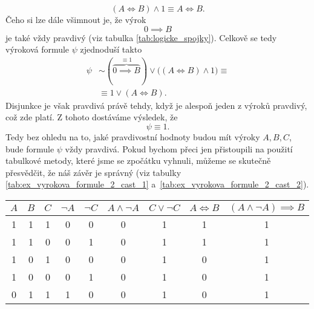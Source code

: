 \begin{example}
\begin{solution}
        \begin{equation*}
            (A \iff B) \land 1 \equiv  A \iff B.
        \end{equation*}
        Čeho si lze dále všimnout je, že výrok
        \begin{equation*}
            0 \implies B
        \end{equation*}
        je také vždy pravdivý (viz tabulka \ref{tab:logicke_spojky}). Celkově se tedy výroková formule $\psi$ zjednoduší takto
        \begin{align*}
            \psi&\sim (\overbrace{0 \implies B}^{\equiv 1}) \lor \bigl((A \iff B) \land 1\bigr)\equiv  \\ &\equiv 1 \lor (A \iff B).
        \end{align*}
        Disjunkce je však pravdivá právě tehdy, když je alespoň jeden z výroků pravdivý, což zde platí. Z tohoto dostáváme výsledek, že
        \begin{equation*}
            \psi\equiv 1.
        \end{equation*}
        Tedy bez ohledu na to, jaké pravdivostní hodnoty budou mít výroky $A,B,C$, bude formule $\psi$ vždy pravdivá. Pokud bychom přeci jen přistoupili na použití tabulkové metody, které jsme se zpočátku vyhnuli, můžeme se skutečně přesvědčit, že náš závěr je správný (viz tabulky \ref{tab:ex_vyrokova_formule_2_cast_1} a~\ref{tab:ex_vyrokova_formule_2_cast_2}).
        \begin{table}[h]
            \centering
            \begin{tabular}{|ccc|cccccc|}
            \hline
            $A$ & $B$ & $C$ & $\neg A$ & $\neg C$ & $A \land \neg A$ & $C \lor \neg C$ & $A \iff B$ & $(A \land \neg A) \implies B$ \\ \hline
            1   & 1   & 1   & 0        & 0        & 0                & 1                 & 1          & 1                             \\
            1   & 1   & 0   & 0        & 1        & 0                & 1                 & 1          & 1                             \\
            1   & 0   & 1   & 0        & 0        & 0                & 1                 & 0          & 1                             \\
            1   & 0   & 0   & 0        & 1        & 0                & 1                 & 0          & 1                             \\
            0   & 1   & 1   & 1        & 0        & 0                & 1                 & 0          & 1                             \\

\end{tabular}
\end{table}
\end{solution}
\end{example}
